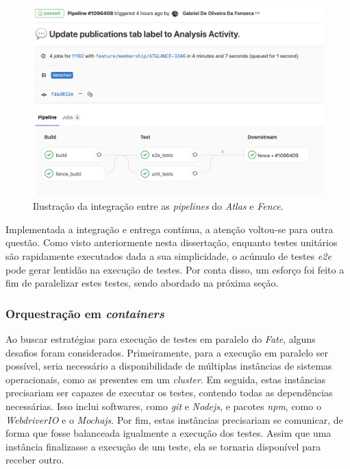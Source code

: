 \begin{figure}[H]
    \centering
    \includegraphics[width=13cm]{source/4-solucao/images/pipeline-update.png}
    \caption{Ilustração da integração entre as \emph{pipelines} do \emph{Atlas} e \emph{Fence}.}
    \label{fig:pipeline-update}
\end{figure}

Implementada a integração e entrega contínua, a atenção voltou-se para outra questão. Como visto anteriormente nesta dissertação, enquanto testes unitários são rapidamente executados dada a sua simplicidade, o acúmulo de testes \emph{e2e} pode gerar lentidão na execução de testes. Por conta disso, um esforço foi feito a fim de paralelizar estes testes, sendo abordado na próxima seção.

\hypertarget{orquestracao-em-containers}{%
\subsubsection{\texorpdfstring{Orquestração em \emph{containers}}{Orquestração em containers}}\label{orquestracao-em-containers}}

Ao buscar estratégias para execução de testes em paralelo do \emph{Fate}, alguns desafios foram considerados. Primeiramente, para a execução em paralelo ser possível, seria necessário a disponibilidade de múltiplas instâncias de sistemas operacionais, como as presentes em um \emph{cluster}. Em seguida, estas instâncias precisariam ser capazes de executar os testes, contendo todas as dependências necessárias. Isso inclui softwares, como \emph{git} e \emph{Nodejs}, e pacotes \emph{npm}, como o \emph{WebdriverIO} e o \emph{Mochajs}. Por fim, estas instâncias precisariam se comunicar, de forma que fosse balanceada igualmente a execução dos testes. Assim que uma instância finalizasse a execução de um teste, ela se tornaria disponível para receber outro.

